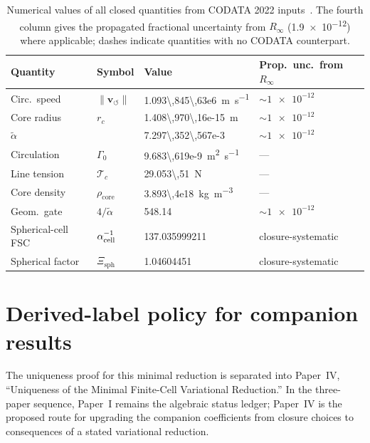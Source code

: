 \documentclass[aps,pra,preprint,longbibliography,nofootinbib]{revtex4-2}
\newcommand{\vnorm}{\lVert\mathbf{v}_{\!\boldsymbol{\circlearrowleft}}\rVert} %
\newcommand{\rhocore}{\rho_{\mathrm{core}}}      %
\newcommand{\rc}{r_c}                            %
\newcommand{\Rinf}{R_\infty}                     %
\newcommand{\Tc}{\mathcal{T}_c}                  %
\newcommand{\Gz}{\Gamma_0}                       %
\newcommand{\Xsph}{\Xi_{\mathrm{sph}}}             %
\begin{document}
\begin{table}[h]
\centering
\caption{Numerical values of all closed quantities from CODATA 2022
inputs~\cite{MohrTaylor2022}.
The fourth column gives the propagated fractional uncertainty from $\Rinf$
(\num{1.9e-12}) where applicable; dashes indicate quantities with no
CODATA counterpart.}
\label{tab:numbers}
\begin{tabular}{llll}
\toprule
Quantity & Symbol & Value & Prop.\ unc.\ from $\Rinf$ \\
\midrule
Circ.\ speed   & $\vnorm$ & \SI{1.093\,845\,63e6}{\m\per\s}      & $\sim\num{1e-12}$ \\
Core radius    & $\rc$    & \SI{1.408\,970\,16e-15}{\meter}       & $\sim\num{1e-12}$ \\
$\tilde\alpha$ &          & \num{7.297\,352\,567e-3}              & $\sim\num{1e-12}$ \\
Circulation    & $\Gz$    & \SI{9.683\,619e-9}{\m\squared\per\s}  & — \\
Line tension   & $\Tc$    & \SI{29.053\,51}{\newton}               & — \\
Core density   & $\rhocore$& \SI{3.893\,4e18}{\kg\per\m\cubed}    & — \\
Geom.\ gate    & $4/\tilde\alpha$ & \num{548.14}               & $\sim\num{1e-12}$ \\
Spherical-cell FSC & $\alpha_{\rm cell}^{-1}$ & \num{137.035999211} & closure-systematic \\
Spherical factor & $\Xsph$ & \num{1.04604451} & closure-systematic \\
\bottomrule
\end{tabular}
\end{table}


\section{Derived-label policy for companion results}
\label{sec:derived-label-policy}


The uniqueness proof for this minimal reduction is separated into
Paper~IV, ``Uniqueness of the Minimal Finite-Cell Variational Reduction.''  In
the three-paper sequence, Paper~I remains the algebraic status ledger; Paper~IV
is the proposed route for upgrading the companion coefficients from closure
choices to consequences of a stated variational reduction.
\end{document}

